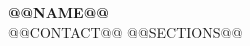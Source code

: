 \documentclass[10pt]{article}
\begin{document}
{\Large \textbf{@@NAME@@}}\\
@@CONTACT@@
@@SECTIONS@@
\end{document}
